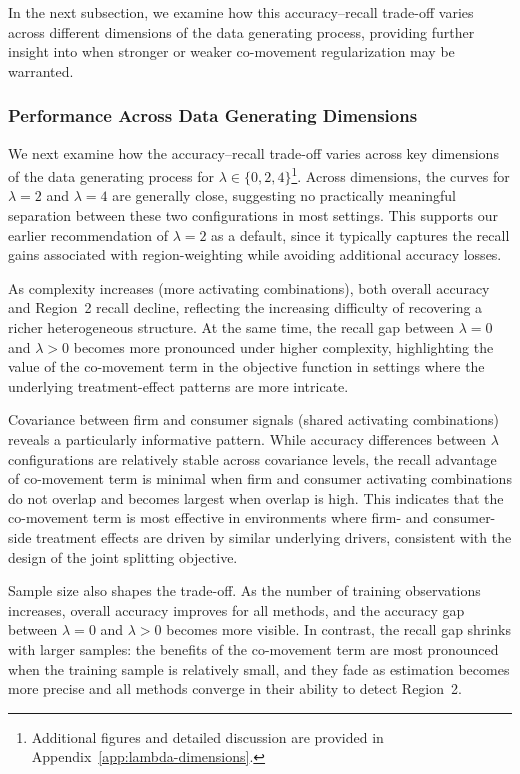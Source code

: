 \documentclass[11pt,letterpaper,english]{article}
\theoremstyle{definition}
\theoremstyle{definition}
\begin{document}
\begin{bibunit}
In the next subsection, we examine how this accuracy--recall trade-off varies across different dimensions of the data generating process, providing further insight into when stronger or weaker co-movement regularization may be warranted.

\subsubsection{Performance Across Data Generating Dimensions}
\label{sec:lambda-dimensions}

We next examine how the accuracy--recall trade-off varies across key dimensions of the data generating process for $\lambda\in\{0,2,4\}$\footnote{Additional figures and detailed discussion are provided in Appendix~\ref{app:lambda-dimensions}.}. Across dimensions, the curves for $\lambda=2$ and $\lambda=4$ are generally close, suggesting no practically meaningful separation between these two configurations in most settings. This supports our earlier recommendation of $\lambda=2$ as a default, since it typically captures the recall gains associated with region-weighting while avoiding additional accuracy losses.

As complexity increases (more activating combinations), both overall accuracy and Region~2 recall decline, reflecting the increasing difficulty of recovering a richer heterogeneous structure. At the same time, the recall gap between $\lambda=0$ and $\lambda>0$ becomes more pronounced under higher complexity, highlighting the value of the co-movement term in the objective function in settings where the underlying treatment-effect patterns are more intricate.

Covariance between firm and consumer signals (shared activating combinations) reveals a particularly informative pattern. While accuracy differences between $\lambda$ configurations are relatively stable across covariance levels, the recall advantage of co-movement term is minimal when firm and consumer activating combinations do not overlap and becomes largest when overlap is high. This indicates that the co-movement term is most effective in environments where firm- and consumer-side treatment effects are driven by similar underlying drivers, consistent with the design of the joint splitting objective.

Sample size also shapes the trade-off. As the number of training observations increases, overall accuracy improves for all methods, and the accuracy gap between $\lambda=0$ and $\lambda>0$ becomes more visible. In contrast, the recall gap shrinks with larger samples: the benefits of the co-movement term are most pronounced when the training sample is relatively small, and they fade as estimation becomes more precise and all methods converge in their ability to detect Region~2.


\end{bibunit}
\end{document}
